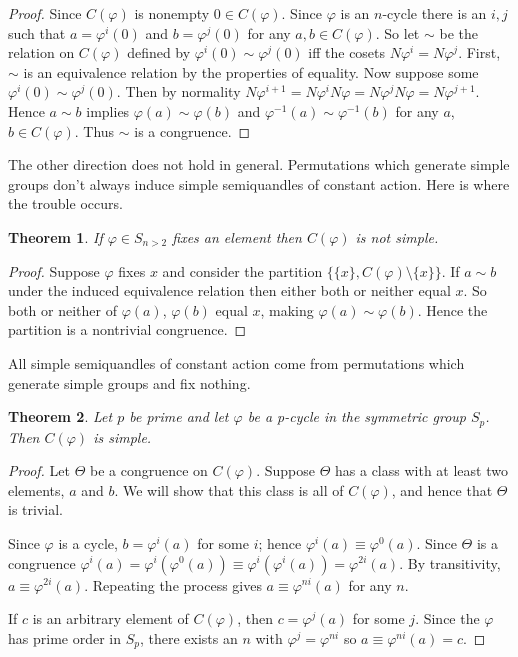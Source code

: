 \documentclass{amsart}
\newtheorem{thm}{Theorem}[section]
\theoremstyle{definition}
\numberwithin{equation}{section}
\begin{document}
\begin{proof}
Since $C(\varphi)$ is nonempty $0 \in C(\varphi)$. Since $\varphi$
is an $n$-cycle there is an $i,j$ such that $a = \varphi^{i}(0)$
and $b = \varphi^{j}(0)$ for any $a,b \in C(\varphi)$.  So let
$\sim$ be the relation on $C(\varphi)$ defined by $\varphi^{i}(0)
\sim \varphi^{j}(0)$ iff the cosets $N\varphi^{i} = N\varphi^{j}$.
First, $\sim$ is an equivalence relation by the properties of
equality. Now suppose some $\varphi^{i}(0) \sim \varphi^{j}(0)$.
Then by normality $N\varphi^{i+1} = N\varphi^{i}N\varphi =
N\varphi^{j}N\varphi = N\varphi^{j+1}$. Hence $a \sim b$ implies
$\varphi(a) \sim \varphi(b)$ and $\varphi^{-1}(a) \sim \varphi^{-1}(b)$
for any $a$, $b \in C(\varphi)$. Thus $\sim$ is a congruence.
\end{proof}

The other direction does not hold in general. Permutations which
generate simple groups don't always induce simple semiquandles of
constant action. Here is where the trouble occurs.

\begin{thm}
If $\varphi \in S_{n > 2}$ fixes an element then $C(\varphi)$ is
not simple.
\end{thm}

\begin{proof}
Suppose $\varphi$ fixes $x$ and consider the partition $\{ \{x\},
C(\varphi) \setminus \{x\} \}$.  If $a \sim b$ under the induced
equivalence relation then either both or neither equal $x$.  So
both or neither of $\varphi(a)$, $\varphi(b)$ equal $x$, making
$\varphi(a) \sim \varphi(b)$.  Hence the partition is a nontrivial
congruence.
\end{proof}

All simple semiquandles of constant action come from permutations
which generate simple groups and fix nothing.

\begin{thm}
Let $p$ be prime and let $\varphi$ be a p-cycle in the symmetric
group $S_p$.  Then $C(\varphi)$ is simple.
\end{thm}

\begin{proof}
Let $\Theta$ be a congruence on $C(\varphi)$. Suppose $\Theta$ has
a class with at least two elements, $a$ and $b$. We will show that
this class is all of $C(\varphi)$, and hence that $\Theta$ is
trivial.

Since $\varphi$ is a cycle, $b = \varphi^{i}(a)$ for some $i$; hence
$\varphi^{i}(a) \equiv \varphi^{0}(a)$. Since $\Theta$ is a congruence
$\varphi^{i}(a) = \varphi^{i}(\varphi^{0}(a)) \equiv
\varphi^{i}(\varphi^{i}(a)) = \varphi^{2i}(a)$. By transitivity,
$a \equiv \varphi^{2i}(a)$. Repeating the process gives $a \equiv
\varphi^{ni}(a)$ for any $n$.

If $c$ is an arbitrary element of $C(\varphi)$, then $c = \varphi^{j}(a)$
for some $j$.  Since the $\varphi$ has prime order in $S_p$, there
exists an $n$ with $\varphi^{j} = \varphi^{ni}$ so $a \equiv
\varphi^{ni}(a) = c$.  \end{proof}
\end{document}
